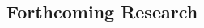 \documentclass[a0,portrait]{a0poster}
\begin{document}
\begin{multicols}{2}






\color{DarkSlateGray} %


\section*{Forthcoming Research}


\end{multicols}
\end{document}
